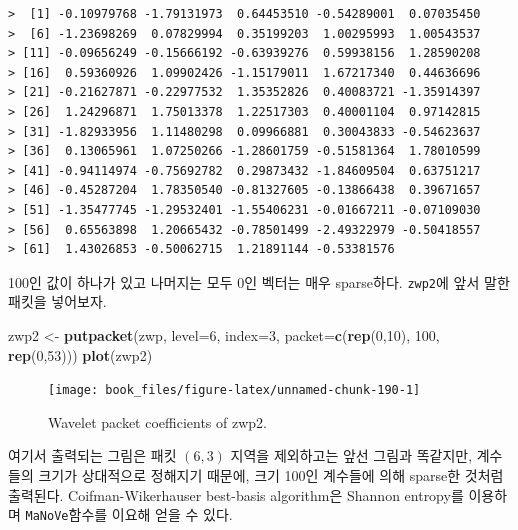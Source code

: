 \documentclass[b5paper,]{scrbook}
\makeatletter
\newenvironment{Shaded}{\begin{snugshade}}{\end{snugshade}}
\newcommand{\KeywordTok}[1]{\textcolor[rgb]{0.13,0.29,0.53}{\textbf{{#1}}}}
\newcommand{\DataTypeTok}[1]{\textcolor[rgb]{0.13,0.29,0.53}{{#1}}}
\newcommand{\DecValTok}[1]{\textcolor[rgb]{0.00,0.00,0.81}{{#1}}}
\newcommand{\StringTok}[1]{\textcolor[rgb]{0.31,0.60,0.02}{{#1}}}
\newcommand{\NormalTok}[1]{{#1}}
\theoremstyle{plain}
\theoremstyle{definition}
\numberwithin{equation}{section}
\newenvironment{kframe}{%
\medskip{}
\setlength{\fboxsep}{.8em}
 \def\at@end@of@kframe{}%
 \ifinner\ifhmode%
  \def\at@end@of@kframe{\end{minipage}}%
  \begin{minipage}{\columnwidth}%
 \fi\fi%
 \def\FrameCommand##1{\hskip\@totalleftmargin \hskip-\fboxsep
 \colorbox{shadecolor}{##1}\hskip-\fboxsep
     \hskip-\linewidth \hskip-\@totalleftmargin \hskip\columnwidth}%
 \MakeFramed {\advance\hsize-\width
   \@totalleftmargin\z@ \linewidth\hsize
   \@setminipage}}%
 {\par\unskip\endMakeFramed%
 \at@end@of@kframe}
\renewenvironment{Shaded}{\begin{kframe}}{\end{kframe}}
\makeatother
\begin{document}
\begin{verbatim}
>  [1] -0.10979768 -1.79131973  0.64453510 -0.54289001  0.07035450
>  [6] -1.23698269  0.07829994  0.35199203  1.00295993  1.00543537
> [11] -0.09656249 -0.15666192 -0.63939276  0.59938156  1.28590208
> [16]  0.59360926  1.09902426 -1.15179011  1.67217340  0.44636696
> [21] -0.21627871 -0.22977532  1.35352826  0.40083721 -1.35914397
> [26]  1.24296871  1.75013378  1.22517303  0.40001104  0.97142815
> [31] -1.82933956  1.11480298  0.09966881  0.30043833 -0.54623637
> [36]  0.13065961  1.07250266 -1.28601759 -0.51581364  1.78010599
> [41] -0.94114974 -0.75692782  0.29873432 -1.84609504  0.63751217
> [46] -0.45287204  1.78350540 -0.81327605 -0.13866438  0.39671657
> [51] -1.35477745 -1.29532401 -1.55406231 -0.01667211 -0.07109030
> [56]  0.65563898  1.20665432 -0.78501499 -2.49322979 -0.50418557
> [61]  1.43026853 -0.50062715  1.21891144 -0.53381576
\end{verbatim}

100인 값이 하나가 있고 나머지는 모두 0인 벡터는 매우 sparse하다.
\texttt{zwp2}에 앞서 말한 패킷을 넣어보자.

\begin{Shaded}
\begin{Highlighting}[]
\NormalTok{zwp2 <-}\StringTok{ }\KeywordTok{putpacket}\NormalTok{(zwp, }\DataTypeTok{level=}\DecValTok{6}\NormalTok{, }\DataTypeTok{index=}\DecValTok{3}\NormalTok{, }\DataTypeTok{packet=}\KeywordTok{c}\NormalTok{(}\KeywordTok{rep}\NormalTok{(}\DecValTok{0}\NormalTok{,}\DecValTok{10}\NormalTok{), }\DecValTok{100}\NormalTok{, }\KeywordTok{rep}\NormalTok{(}\DecValTok{0}\NormalTok{,}\DecValTok{53}\NormalTok{)))}
\KeywordTok{plot}\NormalTok{(zwp2)}
\end{Highlighting}
\end{Shaded}

\begin{figure}

{\centering \texttt{[image: book\_files/figure-latex/unnamed-chunk-190-1]} 

}

\caption{Wavelet packet coefficients of zwp2.}\label{fig:unnamed-chunk-190}
\end{figure}

여기서 출력되는 그림은 패킷 \((6,3)\) 지역을 제외하고는 앞선 그림과
똑같지만, 계수들의 크기가 상대적으로 정해지기 때문에, 크기 100인
계수들에 의해 sparse한 것처럼 출력된다. Coifman-Wikerhauser best-basis
algorithm은 Shannon entropy를 이용하며 \texttt{MaNoVe}함수를 이요해 얻을
수 있다.
\end{document}
